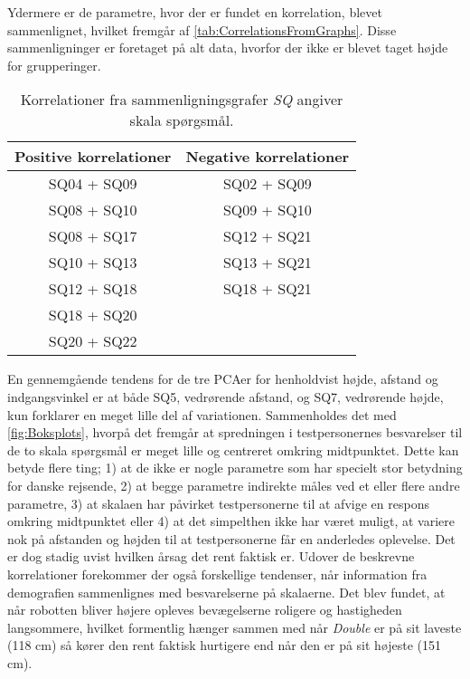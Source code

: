 %
Ydermere er de parametre, hvor der er fundet en korrelation, blevet sammenlignet, hvilket fremgår af \autoref{tab:CorrelationsFromGraphs}. Disse sammenligninger er foretaget på alt data, hvorfor der ikke er blevet taget højde for grupperinger.
%
\begin{table}[H]
	\centering
	\begin{tabular}{ c|c }
		\centering
		Positive korrelationer & Negative korrelationer \\ \hline
		SQ04 + SQ09 & SQ02 + SQ09 \\ 
		SQ08 + SQ10 & SQ09 + SQ10 \\ 
		SQ08 + SQ17 & SQ12 + SQ21 \\ 
		SQ10 + SQ13 & SQ13 + SQ21 \\ 
		SQ12 + SQ18 & SQ18 + SQ21	\\	
		SQ18 + SQ20 & 							\\
		SQ20 + SQ22 & 
	\end{tabular}        
\caption{Korrelationer fra sammenligningsgrafer \textit{SQ} angiver skala spørgsmål.}
\label{tab:CorrelationsFromGraphs} 
\end{table}
\noindent
%
En gennemgående tendens for de tre PCAer for henholdvist højde, afstand og indgangsvinkel er at både SQ5, vedrørende afstand, og SQ7, vedrørende højde, kun forklarer en meget lille del af variationen. Sammenholdes det med \autoref{fig:Boksplots}, hvorpå det fremgår at spredningen i testpersonernes besvarelser til de to skala spørgsmål er meget lille og centreret omkring midtpunktet. Dette kan betyde flere ting; 1) at de ikke er nogle parametre som har specielt stor betydning for danske rejsende, 2) at begge parametre indirekte måles ved et eller flere andre parametre, 3) at skalaen har påvirket testpersonerne til at afvige en respons omkring midtpunktet eller 4) at det simpelthen ikke har været muligt, at variere nok på afstanden og højden til at testpersonerne får en anderledes oplevelse. Det er dog stadig uvist hvilken årsag det rent faktisk er.\blankline  
%
Udover de beskrevne korrelationer forekommer der også forskellige tendenser, når information fra demografien sammenlignes med besvarelserne på skalaerne. Det blev fundet, at når robotten bliver højere opleves bevægelserne roligere og hastigheden langsommere, hvilket formentlig hænger sammen med når \textit{Double} er på sit laveste (118 cm) så kører den rent faktisk hurtigere end når den er på sit højeste (151 cm). 

